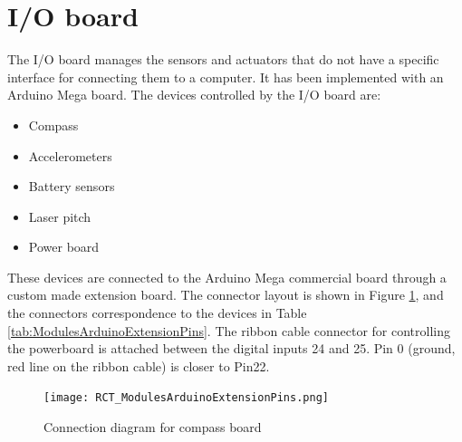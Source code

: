 
\section{I/O board}
\label{sec:devmanual_io}

The I/O board manages the sensors and actuators that do not have a specific interface for connecting them to a computer. It has been implemented with an Arduino Mega board.
The devices controlled by the I/O board are:

\begin{itemize}
  \item Compass
  \item Accelerometers
  \item Battery sensors
  \item Laser pitch
  \item Power board
\end{itemize}

These devices are connected to the Arduino Mega commercial board through a
custom made extension board. The connector layout is shown in Figure
\ref{fig:ModulesArduinoExtensionPins}, and the connectors correspondence to
the devices in Table \ref{tab:ModulesArduinoExtensionPins}. The ribbon cable
connector  for controlling the powerboard is attached between the digital inputs 24 and 25.
Pin 0 (ground, red line on the ribbon cable) is closer to Pin22.

\begin{figure}[htbp]
\begin{center}
 {\texttt{[image: RCT\_ModulesArduinoExtensionPins.png]}}
\end{center}
\caption{Connection diagram for compass board}
\label{fig:ModulesArduinoExtensionPins}
\end{figure}

